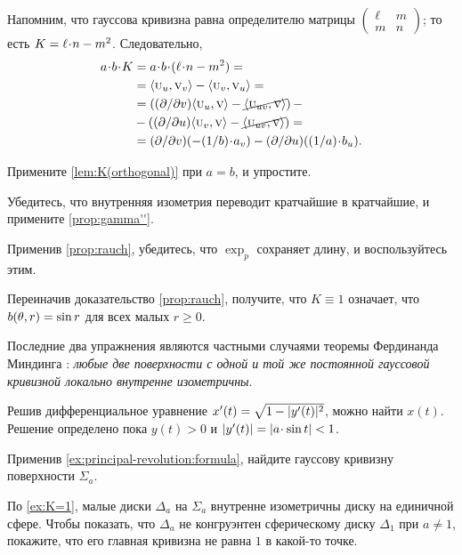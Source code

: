 Напомним, что гауссова кривизна равна определителю матрицы $
(\begin{smallmatrix}
\ell&m
\\
m&n
\end{smallmatrix}
)
$;
то есть $K\z=\ell\cdot n-m^2$.
Следовательно, 
\begin{align*}
a\cdot b\cdot K
&=
a\cdot b\cdot(\ell\cdot n-m^2)
=
\\
&=
\langle\vec u_u,\vec v_v\rangle 
-
\langle\vec u_v,\vec v_u\rangle= 
\\
&= 
\left(
\tfrac{\partial}{\partial v}
\langle\vec u_u,\vec v\rangle
-
\cancel{\langle\vec u_{uv},\vec v\rangle}
\right)-
\\
&-
\left(
\tfrac{\partial}{\partial u}
\langle\vec u_v,\vec v\rangle
-
\cancel{\langle\vec u_{uv},\vec v\rangle}
\right)=
\\
&=\tfrac{\partial}{\partial v}(-\tfrac1{b}\cdot a_v)
-
\tfrac{\partial}{\partial u}(\tfrac1{a}\cdot b_u).
\end{align*}

Примените \ref{lem:K(orthogonal)} при $a=b$, и упростите.

Убедитесь, что внутренняя изометрия переводит кратчайшие в кратчайшие, и примените \ref{prop:gamma''}.

Применив \ref{prop:rauch}, убедитесь, что $\exp_p$ сохраняет длину, и воспользуйтесь этим.

Переиначив доказательство \ref{prop:rauch}, получите, что $K\equiv 1$ означает, что $b(\theta,r)\z=\sin r$ для всех малых $r\ge 0$.

Последние два упражнения являются частными случаями теоремы Фердинанда Миндинга \cite{minding}: \textit{любые две поверхности с одной и той же постоянной гауссовой кривизной локально внутренне изометричны}.

Решив дифференциальное уравнение $x'(t)\z=\sqrt{1-|y'(t)|^2}$, можно найти $x(t)$.
Решение определено пока $y(t)>0$ и $|y'(t)|\z=|a\cdot \sin t|<1$.

Применив \ref{ex:principal-revolution:formula}, найдите гауссову кривизну поверхности $\Sigma_a$.

По \ref{ex:K=1}, малые диски $\Delta_a$ на $\Sigma_a$ внутренне изометричны диску на единичной сфере.
Чтобы показать, что $\Delta_a$ не конгруэнтен сферическому диску $\Delta_1$ при $a\ne 1$, покажите, что его главная кривизна не равна $1$ в какой-то точке.

